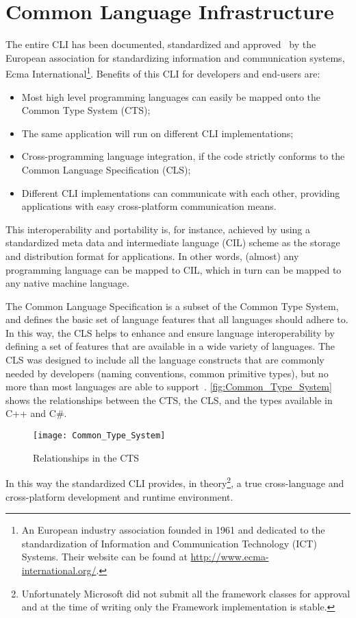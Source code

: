 \section{Common Language Infrastructure}
\label{sec:cts}
The entire CLI has been documented, standardized and approved~\cite{Ecma-335} by the European association for standardizing information and communication systems, Ecma International\footnote{An European industry association founded in 1961 and dedicated to the standardization of Information and Communication Technology (ICT) Systems.
Their website can be found at \url{http://www.ecma-international.org/}.}.
Benefits of this CLI for developers and end-users are:

\begin{itemize}[noitemsep]
  \item Most high level programming languages can easily be mapped onto the Common Type System (CTS);
  \item The same application will run on different CLI implementations;
  \item Cross-programming language integration, if the code strictly conforms to the Common Language Specification (CLS);
  \item Different CLI implementations can communicate with each other, providing applications with easy cross-platform communication means.
\end{itemize}

This interoperability and portability is, for instance, achieved by using a standardized meta data and intermediate language (CIL) scheme as the storage and distribution format for applications.
In other words, (almost) any programming language can be mapped to CIL, which in turn can be mapped to any native machine language.

The Common Language Specification is a subset of the Common Type System, and defines the basic set of language features that all \dotNET languages should adhere to.
In this way, the CLS helps to enhance and ensure language interoperability by defining a set of features that are available in a wide variety of languages.
The CLS was designed to include all the language constructs that are commonly needed by developers 
(\eg naming conventions, common primitive types), but no more than most languages are able to support~\cite{Microsoft03-2}.
\autoref{fig:Common_Type_System} shows the relationships between the CTS, the CLS, and the types available in C++ and C\#.
\begin{figure}
 \centering
 \texttt{[image: Common\_Type\_System]}
 \caption{Relationships in the CTS}
 \label{fig:Common_Type_System}
\end{figure}
In this way the standardized CLI provides, in theory\footnote{Unfortunately Microsoft did not submit all the framework classes for approval and at the time of writing only the \dotNET Framework implementation is stable.}, a true cross-language and cross-platform development and runtime environment.

